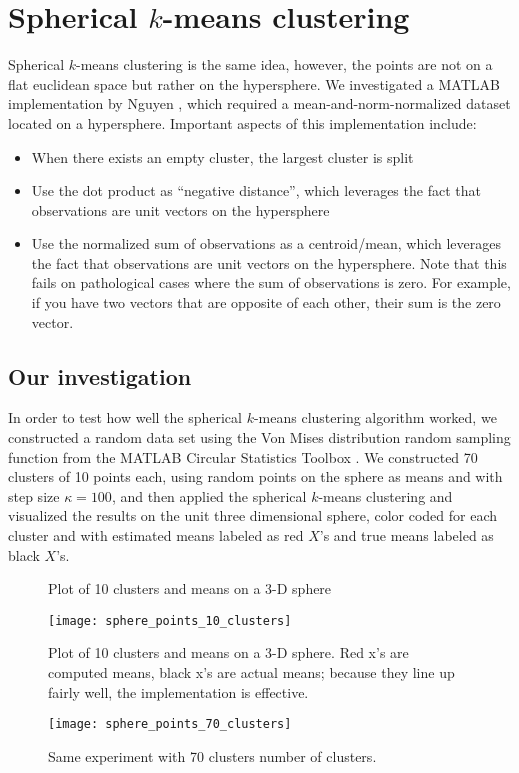 \documentclass[../tech_report_1.tex]{subfiles}
\begin{document}
\section{Spherical $k$-means clustering}

Spherical $k$-means clustering is the same idea, however, the points are not on a flat euclidean space but rather on the hypersphere.
We investigated a MATLAB implementation by Nguyen  \cite{nguyen2008gene,nguyen_spherical_clustering},
which required a mean-and-norm-normalized dataset located on a hypersphere.
Important aspects of this implementation include:
\begin{itemize}
\item When there exists an empty cluster, the largest cluster is split
\item Use the dot product as ``negative distance'', which leverages the
fact that observations are unit vectors on the hypersphere
\item Use the normalized sum of observations as a centroid/mean, which leverages
the fact that observations are unit vectors on the hypersphere. Note
that this fails on pathological cases where the sum of observations
is zero.
For example, if you have two vectors that are opposite of each other, their sum is the zero vector.
\end{itemize}

\subsection{Our investigation}

In order to test how well the spherical $k$-means clustering algorithm
worked, we constructed a random data set using the Von Mises distribution
random sampling function from the MATLAB Circular Statistics Toolbox  \cite{circstats}.
We constructed 70 clusters of 10 points each, using random points
on the sphere as means and with step size $\kappa=100$, and then applied the spherical $k$-means clustering and visualized the results on the unit
three dimensional sphere, color coded for each cluster and with estimated
means labeled as red $X$'s and true means labeled as black $X$'s.



\begin{figure}[H]
\caption{Plot of 10 clusters and means on a 3-D sphere}
\caption{Plot of 10 clusters and means on a 3-D sphere. Red x's are computed means, black x's are actual means; because they line up fairly well, the implementation is effective.}
\texttt{[image: sphere\_points\_10\_clusters]}
\end{figure}

\begin{figure}[H]
\texttt{[image: sphere\_points\_70\_clusters]}
\caption{Same experiment with 70 clusters number of clusters.}
\end{figure}
\end{document}
